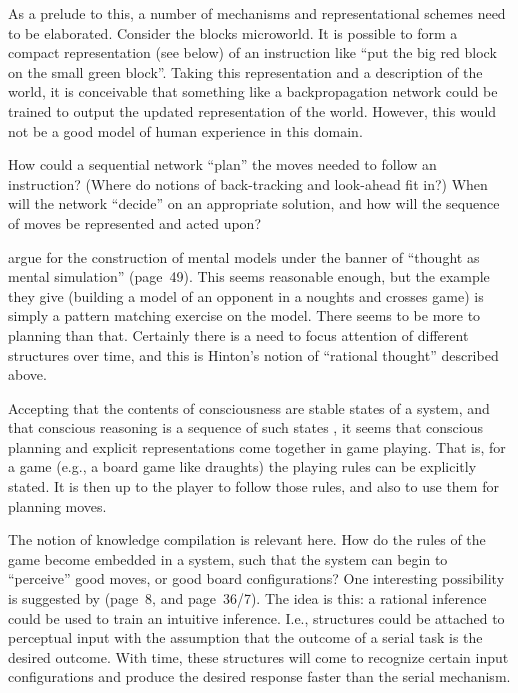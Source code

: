 As a prelude to this, a number of mechanisms and representational
schemes need to be elaborated.  Consider the blocks microworld. It is
possible to form a compact representation (see below) of an
instruction like ``put the big red block on the small green block''.
Taking this representation and a description of the world, it is
conceivable that something like a backpropagation network could be
trained to output the updated representation of the world. However,
this would not be a good model of human experience in this domain.

How could a sequential network ``plan'' the moves needed to follow an
instruction?  (Where do notions of back-tracking and look-ahead fit
in?) When will the network ``decide'' on an appropriate solution, and
how will the sequence of moves be represented and acted upon?

 argue for the construction of mental models under the
banner of ``thought as mental simulation'' (page~49). This seems
reasonable enough, but the example they give (building a model of an
opponent in a noughts and crosses game) is simply a pattern matching
exercise on the model. There seems to be more to planning than that.
Certainly there is a need to focus attention of different structures
over time, and this is Hinton's notion of ``rational thought''
described above.

Accepting that the contents of consciousness are stable states of
a system, and that conscious reasoning is a sequence of such states
\cite[page~39]{pdp:14}, it seems that conscious planning and
explicit representations come together in game playing.  That is, for
a game (e.g., a board game like draughts) the playing rules can be
explicitly stated.  It is then up to the player to follow those rules,
and also to use them for planning moves.

The notion of knowledge compilation is relevant here.  How do the
rules of the game become embedded in a system, such that the system
can begin to ``perceive'' good moves, or good
board configurations? One interesting possibility is
suggested by  (page~8, and page~36/7).  The idea is
this: a rational inference could be used to train an intuitive
inference.  I.e., structures could be attached  to perceptual input
with the assumption that the outcome of a serial task is the desired
outcome.  With time, these structures will come to recognize certain
input configurations and produce the desired response faster than the
serial mechanism.


